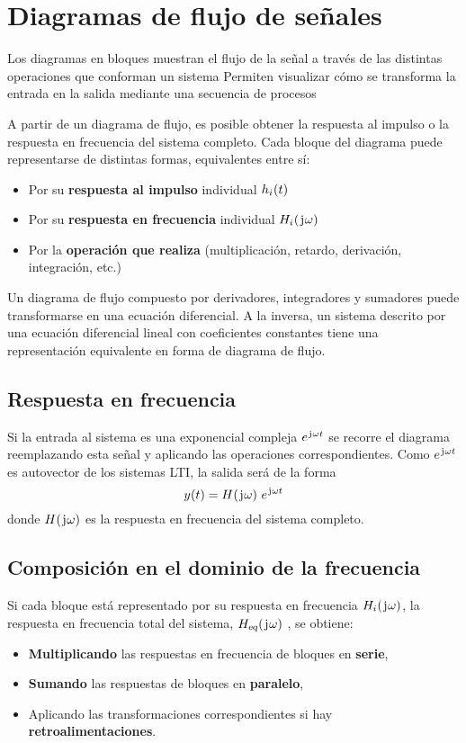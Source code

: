 \chapter{Diagramas de flujo de señales}

Los diagramas en bloques muestran el flujo de la señal a través de las distintas operaciones que conforman un sistema
Permiten visualizar cómo se transforma la entrada en la salida mediante una secuencia de procesos

A partir de un diagrama de flujo, es posible obtener la respuesta al impulso o la respuesta en frecuencia del sistema completo.
Cada bloque del diagrama puede representarse de distintas formas, equivalentes entre sí:

\begin{itemize}
    \item Por su \textbf{respuesta al impulso} individual $\fx[h_\ith]{t}$
    \item Por su \textbf{respuesta en frecuencia} individual $\fx[H_\ith]{\iu \omega}$
    \item Por la \textbf{operación que realiza} (multiplicación, retardo, derivación, integración, etc.)
\end{itemize}

Un diagrama de flujo compuesto por derivadores, integradores y sumadores puede transformarse en una ecuación diferencial.
A la inversa, un sistema descrito por una ecuación diferencial lineal con coeficientes constantes tiene una representación equivalente en forma de diagrama de flujo.

\section{Respuesta en frecuencia}

Si la entrada al sistema es una exponencial compleja $e^{\iu \omega t}$ se recorre el diagrama reemplazando esta señal y aplicando las operaciones correspondientes.
Como $e^{\iu \omega t}$ es autovector de los sistemas LTI, la salida será de la forma
\[
    \fx[y]{t} = \fx[H]{\iu \omega} \, e^{\iu \omega t}
\]
donde $\fx[H]{\iu \omega}$ es la respuesta en frecuencia del sistema completo.

\section{Composición en el dominio de la frecuencia}

Si cada bloque está representado por su respuesta en frecuencia $\fx[H_\ith]{\iu \omega}$, la respuesta en frecuencia total del sistema, $\fx[\sub{H}{eq}]{\iu \omega}$ , se obtiene:
\begin{itemize}
    \item \textbf{Multiplicando} las respuestas en frecuencia de bloques en \textbf{serie},
    \item \textbf{Sumando} las respuestas de bloques en \textbf{paralelo},
    \item Aplicando las transformaciones correspondientes si hay \textbf{retroalimentaciones}.
\end{itemize}

